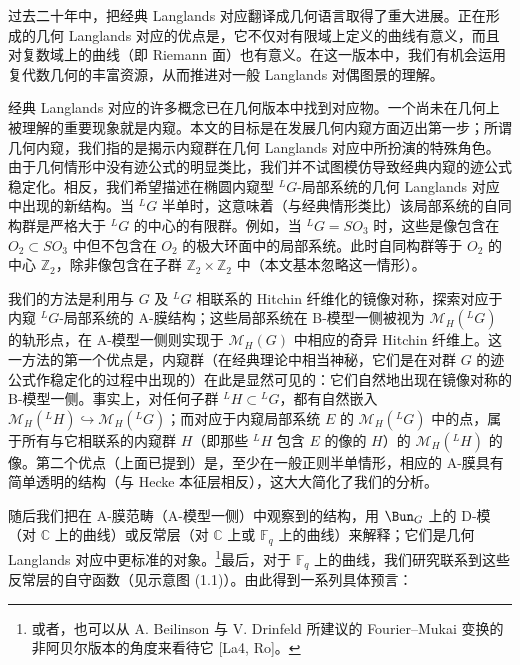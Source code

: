 过去二十年中，把经典 Langlands 对应翻译成几何语言取得了重大进展。正在形成的几何 Langlands 对应的优点是，它不仅对有限域上定义的曲线有意义，而且对复数域上的曲线（即 Riemann 面）也有意义。在这一版本中，我们有机会运用复代数几何的丰富资源，从而推进对一般 Langlands 对偶图景的理解。

经典 Langlands 对应的许多概念已在几何版本中找到对应物。一个尚未在几何上被理解的重要现象就是内窥。本文的目标是在发展几何内窥方面迈出第一步；所谓几何内窥，我们指的是揭示内窥群在几何 Langlands 对应中所扮演的特殊角色。由于几何情形中没有迹公式的明显类比，我们并不试图模仿导致经典内窥的迹公式稳定化。相反，我们希望描述在椭圆内窥型 ${}^{L}G$-局部系统的几何 Langlands 对应中出现的新结构。当 ${}^{L}G$ 半单时，这意味着（与经典情形类比）该局部系统的自同构群是严格大于 ${}^{L}G$ 的中心的有限群。例如，当 ${}^{L}G=SO_3$ 时，这些是像包含在 $O_2\subset SO_3$ 中但不包含在 $O_2$ 的极大环面中的局部系统。此时自同构群等于 $O_2$ 的中心 $\mathbb{Z}_2$，除非像包含在子群 $\mathbb{Z}_2\times\mathbb{Z}_2$ 中（本文基本忽略这一情形）。

我们的方法是利用与 $G$ 及 ${}^{L}G$ 相联系的 Hitchin 纤维化的镜像对称，探索对应于内窥 ${}^{L}G$-局部系统的 A-膜结构；这些局部系统在 B-模型一侧被视为 $\mathcal{M}_H({}^{L}G)$ 的轨形点，在 A-模型一侧则实现于 $\mathcal{M}_H(G)$ 中相应的奇异 Hitchin 纤维上。这一方法的第一个优点是，内窥群（在经典理论中相当神秘，它们是在对群 $G$ 的迹公式作稳定化的过程中出现的）在此是显然可见的：它们自然地出现在镜像对称的 B-模型一侧。事实上，对任何子群 ${}^{L}H\subset{}^{L}G$，都有自然嵌入 $\mathcal{M}_H({}^{L}H)\hookrightarrow\mathcal{M}_H({}^{L}G)$；而对应于内窥局部系统 $E$ 的 $\mathcal{M}_H({}^{L}G)$ 中的点，属于所有与它相联系的内窥群 $H$（即那些 ${}^{L}H$ 包含 $E$ 的像的 $H$）的 $\mathcal{M}_H({}^{L}H)$ 的像。第二个优点（上面已提到）是，至少在一般正则半单情形，相应的 A-膜具有简单透明的结构（与 Hecke 本征层相反），这大大简化了我们的分析。


随后我们把在 A-膜范畴（A-模型一侧）中观察到的结构，用 $\Bun_G$ 上的 D-模（对 $\mathbb{C}$ 上的曲线）或反常层（对 $\mathbb{C}$ 上或 $\mathbb{F}_q$ 上的曲线）来解释；它们是几何 Langlands 对应中更标准的对象。\footnote{或者，也可以从 A. Beilinson 与 V. Drinfeld 所建议的 Fourier--Mukai 变换的非阿贝尔版本的角度来看待它 [La4, Ro]。}最后，对于 $\mathbb{F}_q$ 上的曲线，我们研究联系到这些反常层的自守函数（见示意图 (1.1)）。由此得到一系列具体预言：

